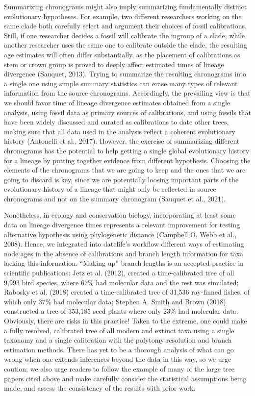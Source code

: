 \documentclass[
  english,
  man]{apa6}
\begin{document}
Summarizing chronograms might also imply summarizing fundamentally distinct evolutionary hypotheses.
For example, two different researchers working on the same clade both carefully select and argument their choices of fossil calibrations.
Still, if one researcher decides a fossil will calibrate the ingroup of a clade, while another researcher uses the same one to calibrate outside the clade, the resulting age estimates will often differ substantially, as the placement of calibrations as stem or crown group is proved to deeply affect estimated times of lineage divergence (Sauquet, 2013). Trying to summarize the resulting chronograms into a single one using simple summary statistics can erase many types of relevant information from the source chronograms. Accordingly, the prevailing view is that we should favor time of lineage divergence estimates obtained from a single analysis, using fossil data as primary sources of calibrations, and using fossils that have been widely discussed and curated as calibrations to date other trees, making sure that all data used in the analysis reflect a coherent evolutionary history (Antonelli et al., 2017).
However, the exercise of summarizing different chronograms has the potential to help getting a single global evolutionary history for a lineage by putting together evidence from different hypothesis. Choosing the elements of the chronograms that we are going to keep and the ones that we are going to discard is key, since we are potentially loosing important parts of the evolutionary history of a lineage that might only be reflected in source chronograms and not on the summary chronogram (Sauquet et al., 2021).

Nonetheless, in ecology and conservation biology, incorporating at least some data on lineage divergence times represents a relevant improvement for testing alternative hypothesis using phylogenetic distance (Campbell O. Webb et al., 2008).
Hence, we integrated into datelife's workflow different ways of estimating node ages in the absence of calibrations and branch length information for taxa lacking this information.
``Making up'' branch lengths is an accepted practice in scientific publications: Jetz et al. (2012), created a time-calibrated tree of all 9,993 bird species, where 67\% had molecular data and the rest was simulated; Rabosky et al. (2018) created a time-calibrated tree of 31,536 ray-finned fishes, of which only 37\% had molecular data; Stephen A. Smith and Brown (2018) constructed a tree of 353,185 seed plants where only 23\% had molecular data.
Obviously, there are risks in this practice!
Taken to the extreme, one could make a fully resolved, calibrated tree of all modern and extinct taxa using a single taxonomy and a single calibration with the polytomy resolution and branch estimation methods.
There has yet to be a thorough analysis of what can go wrong when one extends inferences beyond the data in this way, so we urge caution; we also urge readers to follow the example of many of the large tree papers cited above and make carefully consider the statistical assumptions being made, and assess the consistency of the results with prior work.
\end{document}
